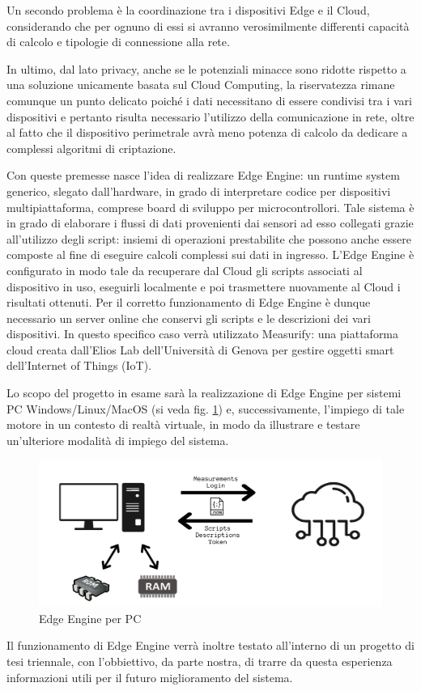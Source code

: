 Un secondo problema è la coordinazione tra i dispositivi Edge e il Cloud, considerando che per ognuno di essi si avranno verosimilmente differenti capacità di calcolo e tipologie di connessione alla rete.

In ultimo, dal lato privacy, anche se le potenziali minacce sono ridotte rispetto a una soluzione unicamente basata sul Cloud Computing, la riservatezza rimane comunque un punto delicato poiché i dati necessitano di essere condivisi tra i vari dispositivi e pertanto risulta necessario l'utilizzo della comunicazione in rete, oltre al fatto che il dispositivo perimetrale avrà meno potenza di calcolo da dedicare a complessi algoritmi di criptazione.

Con queste premesse nasce l'idea di realizzare Edge Engine: un runtime system generico, slegato dall'hardware, in grado di interpretare codice per dispositivi multipiattaforma, comprese board di sviluppo per microcontrollori. Tale sistema è in grado di elaborare i flussi di dati provenienti dai sensori ad esso collegati grazie all'utilizzo degli script: insiemi di operazioni prestabilite che possono anche essere composte al fine di eseguire calcoli complessi sui dati in ingresso. L'Edge Engine è configurato in modo tale da recuperare dal Cloud gli scripts associati al dispositivo in uso, eseguirli localmente e poi trasmettere nuovamente al Cloud i risultati ottenuti. Per il corretto funzionamento di Edge Engine è dunque necessario un server online che conservi gli scripts e le descrizioni dei vari dispositivi. In questo specifico caso verrà utilizzato Measurify: una piattaforma cloud creata dall'Elios Lab dell'Università di Genova per gestire oggetti smart dell'Internet of Things (IoT).

Lo scopo del progetto in esame sarà la realizzazione di Edge Engine per sistemi PC Windows/Linux/MacOS (si veda fig. \ref{edgine}) e, successivamente, l'impiego di tale motore in un contesto di realtà virtuale, in modo da illustrare e testare un'ulteriore modalità di impiego del sistema.

\begin{figure}[H]
	\centering
	\includegraphics[width=\linewidth]{pics/edgine}
	\caption{Edge Engine per PC}
	\label{edgine}
\end{figure}

Il funzionamento di Edge Engine verrà inoltre testato all'interno di un progetto di tesi triennale, con l'obbiettivo, da parte nostra, di trarre da questa esperienza informazioni utili per il futuro miglioramento del sistema.